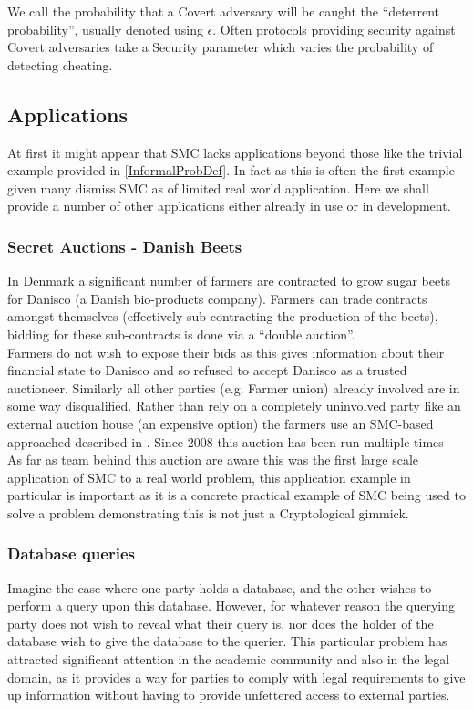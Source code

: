\documentclass[a4paper,10pt]{article}
\begin{document}
				We call the probability that a Covert adversary will be caught the ``deterrent probability'', usually denoted using $\epsilon$. Often protocols providing security against Covert adversaries take a Security parameter which varies the probability of detecting cheating.


		\subsection{Applications} \label{Applications}
			At first it might appear that SMC lacks applications beyond those like the trivial example provided in \ref{InformalProbDef}. In fact as this is often the first example given many dismiss SMC as of limited real world application. Here we shall provide a number of other applications either already in use or in development.


			\subsubsection{Secret Auctions - Danish Beets} \label{BeetsAuctionApplication}
				In Denmark a significant number of farmers are contracted to grow sugar beets for Danisco (a Danish bio-products company). Farmers can trade contracts amongst themselves (effectively sub-contracting the production of the beets), bidding for these sub-contracts is done via a ``double auction''.\\

				Farmers do not wish to expose their bids as this gives information about their financial state to Danisco and so refused to accept Danisco as a trusted auctioneer. Similarly all other parties (e.g. Farmer union) already involved are in some way disqualified. Rather than rely on a completely uninvolved party like an external auction house (an expensive option) the farmers use an SMC-based approached described in \cite{SugarBeets}. Since 2008 this auction has been run multiple times \\

				As far as team behind this auction are aware this was the first large scale application of SMC to a real world problem, this application example in particular is important as it is a concrete practical example of SMC being used to solve a problem demonstrating this is not just a Cryptological gimmick.

			\subsubsection{Database queries} \label{LegalDatabaseApplication}
				Imagine the case where one party holds a database, and the other wishes to perform a query upon this database. However, for whatever reason the querying party does not wish to reveal what their query is, nor does the holder of the database wish to give the database to the querier. This particular problem has attracted significant attention in the academic community and also in the legal domain, as it provides a way for parties to comply with legal requirements to give up information without having to provide unfettered access to external parties.
\end{document}
